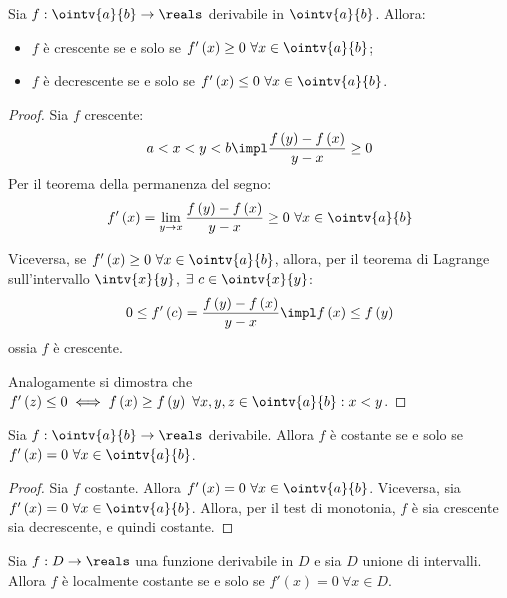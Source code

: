 \begin{theorem}
  Sia $f:\ointv{a}{b}\to\reals$ derivabile in $\ointv{a}{b}$. Allora:
  \begin{itemize}
    \item $f$ è crescente se e solo se $f'\left( x \right)\ge0\ \forall x\in\ointv{a}{b}$;
    \item $f$ è decrescente se e solo se $f'\left( x \right)\le0\ \forall x\in\ointv{a}{b}$.
  \end{itemize}
\end{theorem}
\begin{proof}
  Sia $f$ crescente:
  $$a<x<y<b\impl\frac{f\left( y \right)-f\left( x \right)}{y-x}\ge0$$
  Per il teorema della permanenza del segno:
  $$f'\left( x \right)=\lim_{y\to x}\frac{f\left( y \right)-f\left( x \right)}{y-x}\ge0\ \forall x\in\ointv{a}{b}$$
  
  Viceversa, se $f'\left( x \right)\ge0\ \forall x\in\ointv{a}{b}$, allora, per il teorema di Lagrange sull'intervallo $\intv{x}{y}$, $\exists\ c\in\ointv{x}{y}$:
  $$0\le f'\left( c \right)=\frac{f\left( y \right)-f\left( x \right)}{y-x}\impl f\left( x \right)\le f\left( y \right)$$
  ossia $f$ è crescente.
  
  Analogamente si dimostra che $f'\left( z \right)\le0\iff f\left( x \right)\ge f\left( y \right)\ \forall x,y,z\in\ointv{a}{b}:x<y$.
\end{proof}

\begin{corollary}
  Sia $f:\ointv{a}{b}\to\reals$ derivabile. Allora $f$ è costante se e solo se $f'\left( x \right)=0\ \forall x\in\ointv{a}{b}$.
\end{corollary}
\begin{proof}
  Sia $f$ costante. Allora $f'\left( x \right)=0\ \forall x\in\ointv{a}{b}$.
  Viceversa, sia $f'\left( x \right)=0\ \forall x\in\ointv{a}{b}$. Allora, per il test di monotonia, $f$ è sia crescente sia decrescente, e quindi costante.
\end{proof}

\begin{corollary}
  Sia $f:D\to\reals$ una funzione derivabile in $D$ e sia $D$ unione di intervalli. Allora $f$ è localmente costante se e solo se $f'\left( x \right)=0\ \forall x\in D$.
\end{corollary}

